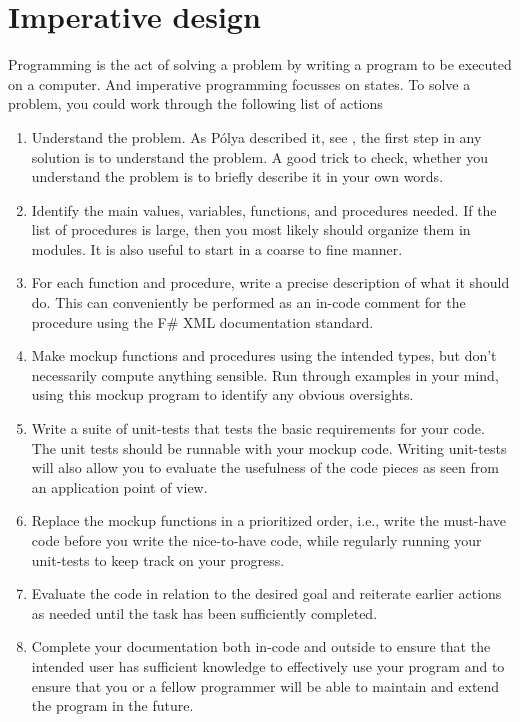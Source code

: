 \section{Imperative design}
Programming is the act of solving a problem by writing a program to be executed on a computer. And imperative programming focusses on states. To solve a problem, you could work through the following list of actions
\begin{enumerate}
\item Understand the problem. As Pólya described it, see , the first step in any solution is to understand the problem. A good trick to check, whether you understand the problem is to briefly describe it in your own words.
\item Identify the main values, variables, functions, and procedures needed. If the list of procedures is large, then you most likely should organize them in modules. It is also useful to start in a coarse to fine manner.
\item For each function and procedure, write a precise description of what it should do. This can conveniently be performed as an in-code comment for the procedure using the F\# XML documentation standard.
\item Make mockup functions and procedures using the intended types, but don't necessarily compute anything sensible. Run through examples in your mind, using this mockup program to identify any obvious oversights.
\item Write a suite of unit-tests that tests the basic requirements for your code. The unit tests should be runnable with your mockup code. Writing unit-tests will also allow you to evaluate the usefulness of the code pieces as seen from an application point of view.
\item Replace the mockup functions in a prioritized order, i.e., write the must-have code before you write the nice-to-have code, while regularly running your unit-tests to keep track on your progress.
\item Evaluate the code in relation to the desired goal and reiterate earlier actions as needed until the task has been sufficiently completed.
\item Complete your documentation both in-code and outside to ensure that the intended user has sufficient knowledge to effectively use your program and to ensure that you or a fellow programmer will be able to maintain and extend the program in the future.
\end{enumerate}

